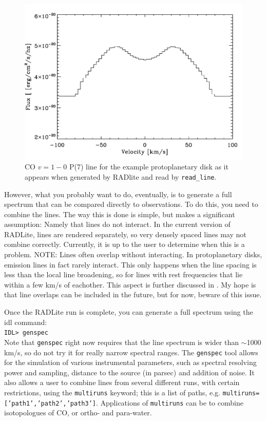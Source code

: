 \documentclass[11pt]{article}
\begin{document}
\begin{figure}
\centering
\includegraphics[width=12cm]{CO_exampleline.pdf}
\caption{CO $v=1-0$ P(7) line for the example protoplanetary disk as it appears when generated by RADlite and read by {\tt read\_line}. }
\end{figure}

However, what you probably want to do, eventually, is to generate a full spectrum that can be compared directly
to observations. To do this, you need to combine the lines. The way this is done is simple, but makes a significant assumption: Namely that lines do
not interact. In the current version of RADLite, lines are rendered separately, so very densely spaced lines may not combine correctly. Currently, 
it is up to the user to determine when this is a problem. NOTE: Lines often overlap without interacting. In protoplanetary disks, emission lines in fact rarely
interact. This only happens when the line spacing is less than the local line broadening, so for lines with rest frequencies that lie within a few km/s of eachother. 
This aspect is further discussed in \cite{Pontoppidan09}. My hope is that line overlaps can be included in the future, but for now, beware of this issue. 

Once the RADLite run is complete, you can generate a full spectrum using the idl command:\\
{\tt IDL> genspec}\\

Note that {\tt genspec} right now requires that the line spectrum is wider than $\sim$1000\,km/s, so do not try it for really narrow spectral ranges. The {\tt genspec}
tool allows for the simulation of various instrumental parameters, such as spectral resolving power and sampling, distance to the source (in parsec) and addition of noise.
It also allows a user to combine lines from several different runs, with certain restrictions, using the {\tt multiruns} keyword; this is a list of paths, e.g. {\tt multiruns=['path1','path2','path3']}.
Applications of {\tt multiruns} can be to combine isotopologues of CO, or ortho- and para-water. 
\end{document}
